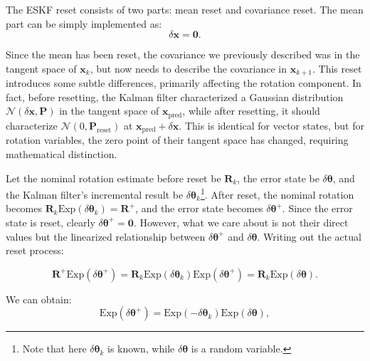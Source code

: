 The ESKF reset consists of two parts: mean reset and covariance reset. The mean part can be simply implemented as:
\begin{equation}\label{eq:mean-reset}
	\delta \mathbf{x} = \mathbf{0}.
\end{equation}

Since the mean has been reset, the covariance we previously described was in the tangent space of $\mathbf{x}_k$, but now needs to describe the covariance in $\mathbf{x}_{k+1}$. This reset introduces some subtle differences, primarily affecting the rotation component. In fact, before resetting, the Kalman filter characterized a Gaussian distribution $\mathcal{N}(\delta \mathbf{x}, \mathbf{P})$ in the tangent space of $\mathbf{x}_{\mathrm{pred}}$, while after resetting, it should characterize $\mathcal{N}(0, \mathbf{P}_{\mathrm{reset}})$ at $\mathbf{x}_{\mathrm{pred}} + \delta \mathbf{x}$. This is identical for vector states, but for rotation variables, the zero point of their tangent space has changed, requiring mathematical distinction.

Let the nominal rotation estimate before reset be $\mathbf{R}_k$, the error state be $\delta \boldsymbol{\theta}$, and the Kalman filter's incremental result be $\delta \boldsymbol{\theta}_k$\footnote{Note that here $\delta \boldsymbol{\theta}_k$ is known, while $\delta \boldsymbol{\theta}$ is a random variable.}. After reset, the nominal rotation becomes $\mathbf{R}_k \mathrm{Exp}(\delta \boldsymbol{\theta}_k)=\mathbf{R}^+$, and the error state becomes $\delta \boldsymbol{\theta}^+$. Since the error state is reset, clearly $\delta \boldsymbol{\theta}^+ = \mathbf{0}$. However, what we care about is not their direct values but the linearized relationship between $\delta \boldsymbol{\theta}^+$ and $\delta \boldsymbol{\theta}$. Writing out the actual reset process:

\begin{equation}\label{eq:reset-process}
	\mathbf{R}^+ \mathrm{Exp}(\delta \boldsymbol{\theta}^+) = \mathbf{R}_k \mathrm{Exp}(\delta \boldsymbol{\theta}_k) \mathrm{Exp}(\delta \boldsymbol{\theta}^+) = \mathbf{R}_k \mathrm{Exp}(\delta \boldsymbol{\theta}).
\end{equation}

We can obtain:
\begin{equation}\label{eq:reset-relation}
	\mathrm{Exp}(\delta \boldsymbol{\theta}^+) = \mathrm{Exp}(-\delta \boldsymbol{\theta}_k) \mathrm{Exp}(\delta \boldsymbol{\theta}),
\end{equation}


